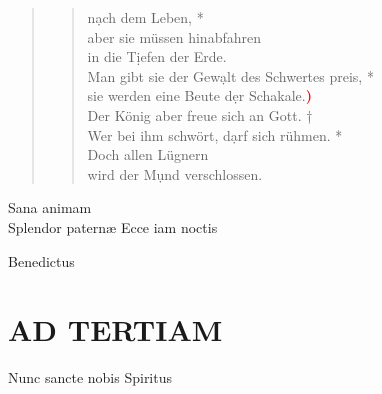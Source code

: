 \begin{quote}
\begin{verse}
\vin n\d ach dem Leben, *\\ 
\vin aber sie müssen hinabfahren\\ 
\vin in die T\d iefen der Erde.\\ 
Man gibt sie der Gew\d alt des Schwertes preis, *\\ 
sie werden eine Beute d\d er Schakale.\textcolor{red}{\bf{)}}\\ \vin 
Der König aber freue sich an Gott. †\\ 
\vin Wer bei ihm schwört, d\d arf sich rühmen. *\\ 
\vin  Doch allen Lügnern\\
\vin wird der M\d und verschlossen.\\  

\end{verse}
\end{quote}

\noindent{} Sana animam \\
\noindent{} Splendor paternæ  Ecce iam noctis 

\begin{flushleft}


\medskip

{\rm{
}}
\end{flushleft}

\medskip


\def\greinitialformat#1{{\fontsize{40}{40}\selectfont #1}}
\gresetfirstlineaboveinitial{\footnotesize \textcolor{red}{Benedic}}{}
\setaboveinitialseparation{0.72mm}

\vspace{0.3cm}
 Benedictus 



\section[HORA TERTIA]{AD TERTIAM}

 Nunc sancte nobis Spiritus 
\vspace{0.3cm}


